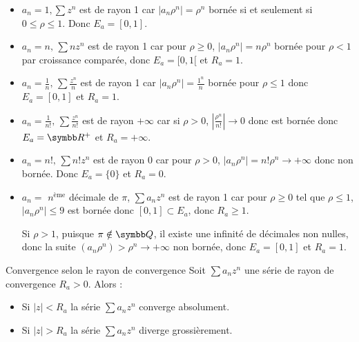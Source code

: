 \begin{exemple}
    \begin{itemize}
        \item $a_n = 1, \sum z^n$ est de rayon 1 car $|a_n \rho^n| = \rho^n$ bornée si et seulement si $0 \leqslant \rho \leqslant 1$.
        Donc $E_a = [0, 1]$. 

        \item $a_n = n, \, \sum n z^n$ est de rayon 1 car pour $\rho \geqslant 0$, $|a_n \rho^n| = n \rho^n$ bornée
        pour $\rho < 1$ par croissance comparée, donc $E_a = [0, 1[$ et $R_a = 1$.

        \item $a_n = \frac 1 n, \, \sum \frac{z^n}{n}$ est de rayon 1 car 
        $|a_n \rho^n| = \frac{1^n} n $ bornée pour $\rho \leqslant 1$ donc $E_a = [0, 1]$ et $R_a = 1$.

        \item $a_n = \frac 1 {n!}, \, \sum \frac{z^n}{n!}$ est de rayon $+\infty$ car
        si $\rho > 0$, $|\frac{\rho^n} {n!}| \to 0$ donc est bornée donc 
        $E_a = \R^+$ et $R_a = +\infty$.
    
        \item $a_n = n!, \, \sum n! z^n$ est de rayon 0 car pour $\rho > 0$,
        $|a_n \rho^n| = n! \rho^n \to +\infty$ donc non bornée. Donc $E_a = \{0\}$ et $R_a = 0$.

        \item $a_n = $ $n^{\text{ème}}$ décimale de $\pi$, $\sum a_n z^n$ est de rayon 1 car
        pour $\rho \geqslant 0$ tel que $\rho \leqslant 1$, $|a_n \rho^n| \leqslant 9$ est bornée 
        donc $[0, 1] \subset E_a$, donc $R_a \geqslant 1$.

        Si $\rho > 1$, puisque $\pi \notin \Q$, il existe une infinité de décimales non nulles, 
        donc la suite $(a_n \rho^n) > \rho^n \to + \infty $ non bornée, 
        donc $E_a = [0, 1]$ et $R_a = 1$. 
    \end{itemize}
\end{exemple}

\begin{proposition}{Convergence selon le rayon de convergence}{}
    Soit $\sum a_n z^n$ une série de rayon de convergence $R_a > 0$. Alors : 
    \begin{itemize}
        \item Si $|z| < R_a$ la série $\sum a_n z^n$ converge absolument.
        \item Si $|z| > R_a$ la série $\sum a_n z^n$ diverge grossièrement.
    \end{itemize}
\end{proposition}

